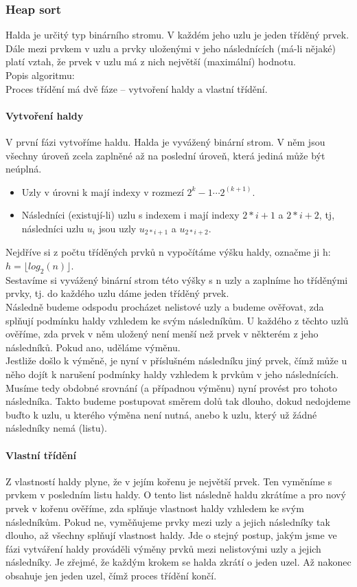 \documentclass[10pt,a4paper]{article}
\begin{document}
\subsubsection{Heap sort}
Halda je určitý typ binárního stromu. V každém jeho uzlu je jeden tříděný prvek. Dále mezi prvkem v uzlu a prvky uloženými v jeho následnících (má-li nějaké) platí vztah, že prvek v uzlu má z nich největší (maximální) hodnotu. \\
Popis algoritmu: \\
Proces třídění má dvě fáze – vytvoření haldy a vlastní třídění.
\paragraph{Vytvoření haldy} V první fázi vytvoříme haldu. Halda je vyvážený binární strom. V něm jsou všechny úroveň zcela zaplněné až na poslední úroveň, která jediná může být neúplná.
\begin{itemize}
	\item Uzly v úrovni k mají indexy v rozmezí $2^k - 1 \cdots 2^{(k + 1 )}$.
	\item Následníci (existují-li) uzlu s indexem i mají indexy $2 \ast i+1$ a $2 \ast i+2$, tj, následníci uzlu $u_i$ jsou uzly $u_{2 \ast i+1}$ a $u_{2 \ast i+2}$.
\end{itemize}
Nejdříve si z počtu tříděných prvků n vypočítáme výšku haldy, označme ji h: \\
$h = \lfloor log_2(n) \rfloor$. \\
Sestavíme si vyvážený binární strom této výšky s n uzly a zaplníme ho tříděnými prvky, tj. do každého uzlu dáme jeden tříděný prvek. \\
Následně budeme odspodu procházet nelistové uzly a budeme ověřovat, zda splňují podmínku haldy vzhledem ke svým následníkům. U každého z těchto uzlů ověříme, zda prvek v něm uložený není menší než prvek v některém z jeho následníků. Pokud ano, uděláme výměnu. \\
Jestliže došlo k výměně, je nyní v příslušném následníku jiný prvek, čímž může u něho dojít k narušení podmínky haldy vzhledem k prvkům v jeho následnících. Musíme tedy obdobné srovnání (a případnou výměnu) nyní provést pro tohoto následníka. Takto budeme postupovat směrem dolů tak dlouho, dokud nedojdeme buďto k uzlu, u kterého výměna není nutná, anebo k uzlu, který už žádné následníky nemá (listu).
\paragraph{Vlastní třídění} Z vlastností haldy plyne, že v jejím kořenu je největší prvek. Ten vyměníme s prvkem v posledním listu haldy. O tento list následně haldu zkrátíme a pro nový prvek v kořenu ověříme, zda splňuje vlastnost haldy vzhledem ke svým následníkům. Pokud ne, vyměňujeme prvky mezi uzly a jejich následníky tak dlouho, až všechny splňují vlastnost haldy. Jde o stejný postup, jakým jsme ve fázi vytváření haldy prováděli výměny prvků mezi nelistovými uzly a jejich následníky. Je zřejmé, že každým krokem se halda zkrátí o jeden uzel. Až nakonec obsahuje jen jeden uzel, čímž proces třídění končí.
\end{document}
